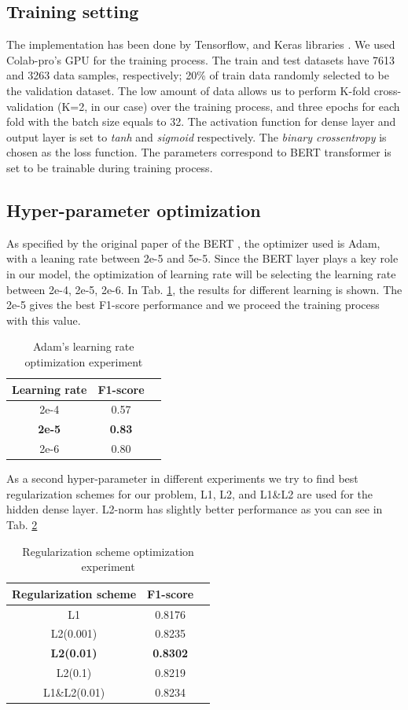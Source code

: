 \documentclass[sigconf]{acmart}
\begin{document}
\subsection{Training setting}
The implementation has been done by Tensorflow, and Keras libraries \cite{keras}. We used Colab-pro's GPU for the training process. The train and test datasets have 7613 and 3263 data samples, respectively; 20\% of train data randomly selected to be the validation dataset. The low amount of data allows us to perform K-fold cross-validation (K=2, in our case) over the training process, and three epochs for each fold with the batch size equals to 32. The activation function for dense layer and output layer is set to \textit{tanh} and \textit{sigmoid} respectively. The \textit{binary crossentropy} is chosen as the loss function. The parameters correspond to BERT transformer is set to be trainable during training process.  

\subsection{Hyper-parameter optimization}
As specified by the original paper of the BERT \cite{devlin2018bert}, the optimizer used is Adam, with a leaning rate between 2e-5 and 5e-5. Since the BERT layer plays a key role in our model, the optimization of learning rate will be selecting the learning rate between 2e-4, 2e-5, 2e-6. In Tab. \ref{tab:lexp}, the results for different learning is shown. The 2e-5 gives the best F1-score performance and we proceed the training process with this value.

\begin{table}
  \caption{Adam's learning rate optimization experiment}
  \label{tab:lexp}
  \begin{tabular}{ccl}
    \toprule
    Learning rate&F1-score\\
    \midrule
    2e-4 & 0.57\\ 
    \textbf{2e-5} & \textbf{0.83}\\ 
    2e-6 & 0.80\\ 
  \bottomrule
\end{tabular}
\end{table}

As a second hyper-parameter in different experiments we try to find best regularization schemes for our problem, L1, L2, and L1\&L2 are used for the hidden dense layer. L2-norm has slightly better performance as you can see in Tab. \ref{tab:rexp}
\begin{table}
  \caption{Regularization scheme optimization experiment}
  \label{tab:rexp}
  \begin{tabular}{ccl}
    \toprule
    Regularization scheme&F1-score\\
    \midrule
    L1 &0.8176\\ 
    L2(0.001)  &0.8235\\ 
    \textbf{L2(0.01)}  &\textbf{0.8302}\\ 
    L2(0.1)  &0.8219\\ 
    L1\&L2(0.01) &0.8234\\
  \bottomrule
\end{tabular}
\end{table}
\end{document}
